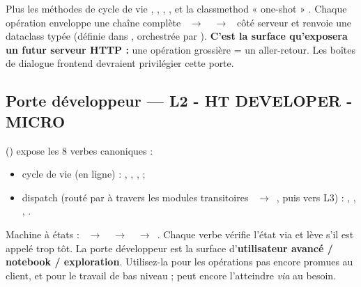 Plus les méthodes de cycle de vie , , , , et la classmethod « one-shot » . Chaque opération enveloppe une chaîne complète ~$\rightarrow$~~$\rightarrow$~ côté serveur et renvoie une dataclass typée  (définie dans , orchestrée par ). \textbf{C'est la surface qu'exposera un futur serveur HTTP :} une opération grossière = un aller-retour. Les boîtes de dialogue frontend devraient privilégier cette porte.

\subsection{Porte développeur --- L2 - HT DEVELOPER - MICRO}

 () expose les 8 verbes canoniques :

\begin{itemize}
    \item cycle de vie (en ligne) : , , ,  ;
    \item dispatch (routé par  à travers les modules transitoires ~$\rightarrow$~, puis vers L3) : , , , .
\end{itemize}

Machine à états : ~$\rightarrow$~~$\rightarrow$~~$\rightarrow$~. Chaque verbe vérifie l'état via  et lève  s'il est appelé trop tôt. La porte développeur est la surface d'\textbf{utilisateur avancé / notebook / exploration}. Utilisez-la pour les opérations pas encore promues au client, et pour le travail de bas niveau ;  peut encore l'atteindre \textit{via}  au besoin.
